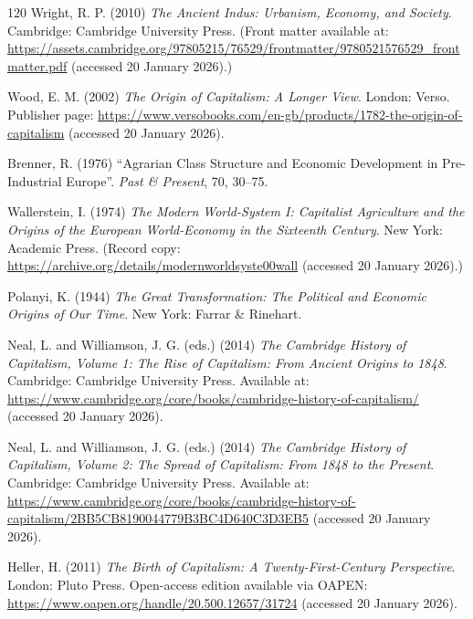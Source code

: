 \begin{singlespace}
\begin{thebibliography}{120}
Wright, R. P. (2010) \emph{The Ancient Indus: Urbanism, Economy, and Society}.
Cambridge: Cambridge University Press.
(Front matter available at: \url{https://assets.cambridge.org/97805215/76529/frontmatter/9780521576529_frontmatter.pdf} (accessed 20 January 2026).)


Wood, E. M. (2002) \emph{The Origin of Capitalism: A Longer View}.
London: Verso.
Publisher page: \url{https://www.versobooks.com/en-gb/products/1782-the-origin-of-capitalism} (accessed 20 January 2026).

Brenner, R. (1976) ``Agrarian Class Structure and Economic Development in Pre-Industrial Europe''.
\emph{Past \& Present}, 70, 30--75.

Wallerstein, I. (1974) \emph{The Modern World-System I: Capitalist Agriculture and the Origins of the European World-Economy in the Sixteenth Century}.
New York: Academic Press.
(Record copy: \url{https://archive.org/details/modernworldsyste00wall} (accessed 20 January 2026).)

Polanyi, K. (1944) \emph{The Great Transformation: The Political and Economic Origins of Our Time}.
New York: Farrar \& Rinehart.

Neal, L. and Williamson, J. G. (eds.) (2014) \emph{The Cambridge History of Capitalism, Volume 1: The Rise of Capitalism: From Ancient Origins to 1848}.
Cambridge: Cambridge University Press.
Available at: \url{https://www.cambridge.org/core/books/cambridge-history-of-capitalism/} (accessed 20 January 2026).

Neal, L. and Williamson, J. G. (eds.) (2014) \emph{The Cambridge History of Capitalism, Volume 2: The Spread of Capitalism: From 1848 to the Present}.
Cambridge: Cambridge University Press.
Available at: \url{https://www.cambridge.org/core/books/cambridge-history-of-capitalism/2BB5CB8190044779B3BC4D640C3D3EB5} (accessed 20 January 2026).

Heller, H. (2011) \emph{The Birth of Capitalism: A Twenty-First-Century Perspective}.
London: Pluto Press.
Open-access edition available via OAPEN: \url{https://www.oapen.org/handle/20.500.12657/31724} (accessed 20 January 2026).


\end{thebibliography}
\end{singlespace}
